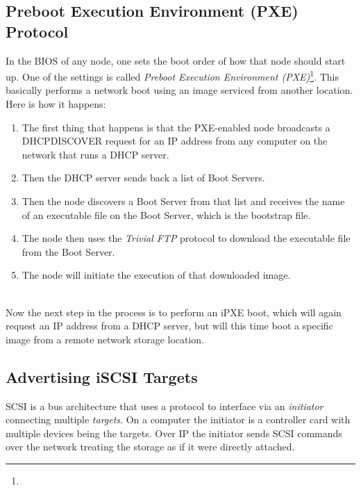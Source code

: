 \subsection{Preboot Execution Environment (PXE) Protocol}

In the BIOS of any node, one sets the boot order of how that node should start up.  One of the settings is called \emph{Preboot Execution Environment (PXE)}\footnote{}.  This basically performs a network boot using an image serviced from another location.  Here is how it happens: \\

\begin{enumerate}

\item The first thing that happens is that the PXE-enabled node broadcasts a DHCPDISCOVER request for an IP address from any computer on the network that runs a DHCP server.

\item Then the DHCP server sends back a list of Boot Servers.

\item Then the node discovers a Boot Server from that list and receives the name of an executable file on the Boot Server, which is the bootstrap file.

\item The node then uses the \emph{Trivial FTP} protocol to download the executable file from the Boot Server.

\item The node will initiate the execution of that downloaded image.

\end{enumerate}

\text{} \\

Now the next step in the process is to perform an iPXE boot, which will again request an IP address from a DHCP server, but will this time boot a specific image from a remote network storage location. \\ 

\subsection{Advertising iSCSI Targets}

SCSI is a bus architecture that uses a protocol to interface via an \emph{initiator} connecting multiple \emph{targets}.  On a computer the initiator is a controller card with multiple devices being the targets.  Over IP the initiator sends SCSI commands over the network treating the storage as if it were directly attached. \\

